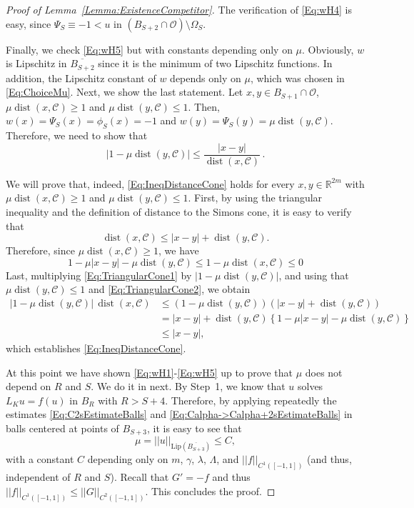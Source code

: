 \documentclass[12pt,reqno]{amsart}
\theoremstyle{definition}
\theoremstyle{remark}
\newcommand{\con}[1]{\mathbb{#1}}
\newcommand{\R}{\con{R}} %
\newcommand{\ccal}{\mathscr{C}}
\newcommand{\ocal}{\mathcal{O}}
\newcommand{\norm}[1]{\left | \left |{#1} \right | \right |}
\newcommand{\s}{\gamma}
\DeclareMathOperator{\dist}{dist}
\numberwithin{equation}{section}
\begin{document}
\begin{proof}[Proof of Lemma~\ref{Lemma:ExistenceCompetitor}]
	The verification of \eqref{Eq:wH4} is easy, since $\Psi_S \equiv-1 < u$ in $(B_{S+2}\cap \ocal)\setminus \Omega_S$.
	
	Finally, we check \eqref{Eq:wH5} but with constants depending only on $\mu$. Obviously, $w$ is Lipschitz in $\overline{B_{S+2}}$ since it is the minimum of two Lipschitz functions. In addition, the Lipschitz constant of $w$ depends only on $\mu$, which was chosen in \eqref{Eq:ChoiceMu}. Next, we show the last statement. Let $x,y \in B_{S+1}\cap \ocal$, $\mu \dist(x,\ccal)\geq 1$ and $\mu \dist(y,\ccal)\leq 1$. Then, $w(x)= \Psi_S(x) = \phi_S(x) = -1$ and $w(y)=\Psi_S(y) = \mu \dist(y,\ccal)$. Therefore, we need to show that
	\begin{equation}
	\label{Eq:IneqDistanceCone}
	|1-\mu \dist(y,\ccal)|\leq \dfrac{|x-y|}{\dist(x,\ccal)}\,.
	\end{equation}
	
	We will prove that, indeed, \eqref{Eq:IneqDistanceCone} holds for every $x,y \in \R^{2m}$ with $\mu \dist(x,\ccal)\geq 1$ and $\mu \dist(y,\ccal)\leq 1$. First, by using the triangular inequality and the definition of distance to the Simons cone, it is easy to verify that
	\begin{equation} 
	\label{Eq:TriangularCone1}
	\dist(x,\ccal) \leq |x-y| + \dist(y,\ccal).
	\end{equation}
	Therefore, since $\mu \dist(x,\ccal)\geq 1$, we have
	\begin{equation} 
	\label{Eq:TriangularCone2}
	1-\mu |x-y|- \mu \dist(y,\ccal) \leq 1-\mu\dist(x,\ccal) \leq 0
	\end{equation}
	Last, multiplying \eqref{Eq:TriangularCone1} by $|1-\mu\dist(y,\ccal)|$, and using that $\mu \dist(y,\ccal)\leq 1$ and \eqref{Eq:TriangularCone2}, we obtain
	\begin{align*}
	|1-\mu\dist(y,\ccal)|\,\dist(x,\ccal) &\leq (1-\mu\dist(y,\ccal)) \left(|x-y| + \dist(y,\ccal)\right) \\
	&= |x-y|+\dist(y,\ccal) \left\{ 1 -\mu |x-y|- \mu \dist(y,\ccal) \right\} \\
	&\leq |x-y|,
	\end{align*}
	which establishes \eqref{Eq:IneqDistanceCone}.
	
	At this point we have shown \eqref{Eq:wH1}-\eqref{Eq:wH5} up to prove that $\mu$ does not depend on $R$ and $S$. We do it in next.	By Step~1, we know that $u$ solves $L_K u = f(u)$ in $B_R$ with $R> S+4$. Therefore, by applying repeatedly the estimates \eqref{Eq:C2sEstimateBalls} and \eqref{Eq:Calpha->Calpha+2sEstimateBalls} in balls centered at points of $B_{S+3}$, it is easy to see that
	$$
	\mu = \norm{u}_{\mathrm{Lip}(\overline{B_{S+3}})} \leq C,
	$$ 
	with a constant $C$ depending only on $m$, $\s$, $\lambda$, $\Lambda$, and $\norm{f}_{C^1([-1,1])}$ (and thus, independent of $R$ and $S$). Recall that $G' = -f$ and thus $\norm{f}_{C^1([-1,1])} \leq \norm{G}_{C^2([-1,1])}$. This concludes the proof.	
\end{proof}
\end{document}
